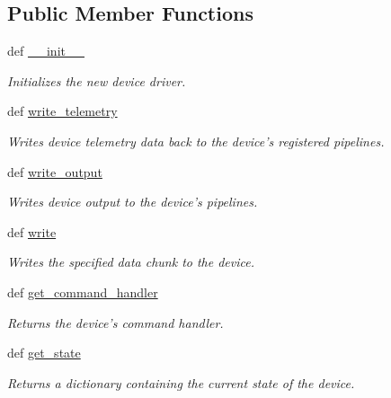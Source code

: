 \subsection*{Public Member Functions}
\begin{DoxyCompactItemize}
\item 
def \hyperlink{classhwm_1_1hardware_1_1devices_1_1drivers_1_1driver_1_1_driver_aec89361151754d9eafad0c3e87d9a519}{\-\_\-\-\_\-init\-\_\-\-\_\-}
\begin{DoxyCompactList}\small\item\em Initializes the new device driver. \end{DoxyCompactList}\item 
def \hyperlink{classhwm_1_1hardware_1_1devices_1_1drivers_1_1driver_1_1_driver_a067a34f90a86b90220aaa85a7196fbd0}{write\-\_\-telemetry}
\begin{DoxyCompactList}\small\item\em Writes device telemetry data back to the device's registered pipelines. \end{DoxyCompactList}\item 
def \hyperlink{classhwm_1_1hardware_1_1devices_1_1drivers_1_1driver_1_1_driver_a4a85862b29fa6a2f9d89d6b26f283a59}{write\-\_\-output}
\begin{DoxyCompactList}\small\item\em Writes device output to the device's pipelines. \end{DoxyCompactList}\item 
def \hyperlink{classhwm_1_1hardware_1_1devices_1_1drivers_1_1driver_1_1_driver_a75544eafe9fea37cc4dd91edb823d9b5}{write}
\begin{DoxyCompactList}\small\item\em Writes the specified data chunk to the device. \end{DoxyCompactList}\item 
def \hyperlink{classhwm_1_1hardware_1_1devices_1_1drivers_1_1driver_1_1_driver_aa1faedf70c6ea90c5093c4be8abe2a62}{get\-\_\-command\-\_\-handler}
\begin{DoxyCompactList}\small\item\em Returns the device's command handler. \end{DoxyCompactList}\item 
def \hyperlink{classhwm_1_1hardware_1_1devices_1_1drivers_1_1driver_1_1_driver_a16773f85a5b550b018c9d427747cd271}{get\-\_\-state}
\begin{DoxyCompactList}\small\item\em Returns a dictionary containing the current state of the device. \end{DoxyCompactList}\item 

\end{DoxyCompactItemize}
